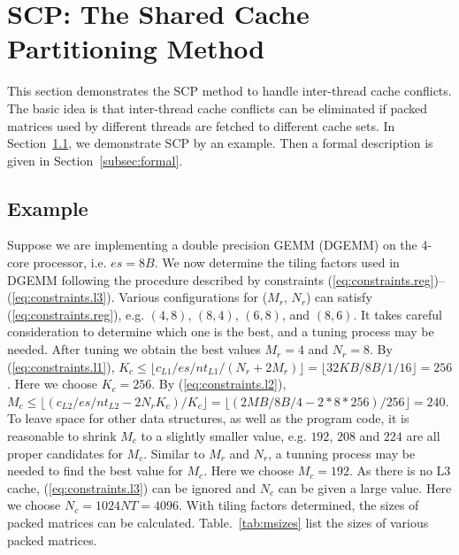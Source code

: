 \section{SCP: The Shared Cache Partitioning Method}\label{sec:scp}

This section demonstrates the SCP method to handle inter-thread cache conflicts.
The basic idea is that inter-thread cache conflicts can be eliminated
if packed matrices used by different threads are fetched to different cache sets.
In Section~\ref{subsec:example}, we demonstrate SCP by an example.
Then a formal description is given in Section~\ref{subsec:formal}.

\subsection{Example}\label{subsec:example}

Suppose we are implementing a double precision GEMM (DGEMM) on
the 4-core processor, i.e. $es=8B$.
We now determine the tiling factors used in DGEMM following the procedure described
by constraints (\ref{eq:constraints.reg})--(\ref{eq:constraints.l3}).
Various configurations for ($M_r$, $N_r$) can satisfy (\ref{eq:constraints.reg}),
e.g. $(4,8)$, $(8,4)$, $(6,8)$, and $(8,6)$. 
It takes careful consideration to determine which one is the best,
and a tuning process may be needed.
After tuning we obtain the best values $M_r = 4$ and $N_r = 8$.
By (\ref{eq:constraints.l1}),
$K_c \le \lfloor c_{L1}/es/nt_{L1}/(N_r + 2 M_r) \rfloor = \lfloor 32KB/8B/1/16 \rfloor = 256$.
Here we choose $K_c=256$.
By (\ref{eq:constraints.l2}),
$M_c \le \lfloor (c_{L2}/es/nt_{L2} - 2 N_r K_c )/ K_c \rfloor =
\lfloor (2MB/8B/4 - 2*8*256)/256 \rfloor = 240$.
To leave space for other data structures, as well as the program code,
it is reasonable to shrink $M_c$ to a slightly smaller value,
e.g. $192$, $208$ and $224$ are all proper candidates for $M_c$.
Similar to $M_r$ and $N_r$, a tunning process may be needed to
find the best value for $M_c$.
Here we choose $M_c = 192$.
As there is no L3 cache, (\ref{eq:constraints.l3}) can be ignored
and $N_c$ can be given a large value.
Here we choose $N_c = 1024NT = 4096$.
With tiling factors determined, the sizes of packed matrices
can be calculated. Table.~\ref{tab:msizes} list the sizes of
various packed matrices.

